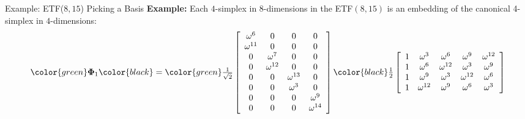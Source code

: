 \documentclass[12pt]{beamer}
\newcommand{\bfPhi}{\boldsymbol{\Phi}}
\begin{document}
\begin{frame}[noframenumbering]{Example: ETF($8,15$) Picking a Basis}
\textbf{Example:} Each $4$-simplex in $8$-dimensions in the ETF$(8,15)$ is an embedding of the canonical 4-simplex in $4$-dimensions:
\begin{equation*}
\color{green}
\bfPhi_1
\color{black}
=
\color{green}
\tfrac{1}{\sqrt{2}}\left[\begin{array}{cccc}
\omega^6 & 0 & 0 & 0\\
	\omega^{11} & 0 & 0 & 0\\
	0 & \omega^7 & 0 & 0\\
	0 & \omega^{12} & 0 & 0\\
	0 & 0 & \omega^{13} & 0\\
	0 & 0 & \omega^{3} & 0\\
	0 & 0 & 0 & \omega^9\\
	0 & 0 & 0 & \omega^{14}
	\end{array}\right]
	\color{black}
	\tfrac{1}{2}\left[\begin{array}{ccccc}
    1 & \omega^{3} &\omega^{6} &\omega^{9} & \omega^{12}\\
    1 & \omega^{6} &\omega^{12} &\omega^{3} & \omega^{9}\\
    1 & \omega^{9} &\omega^{3} &\omega^{12} & \omega^{6}\\
    1 & \omega^{12} &\omega^{9} &\omega^{6} & \omega^{3}\\
    \end{array}\right]
\end{equation*}


\end{frame}
\end{document}
